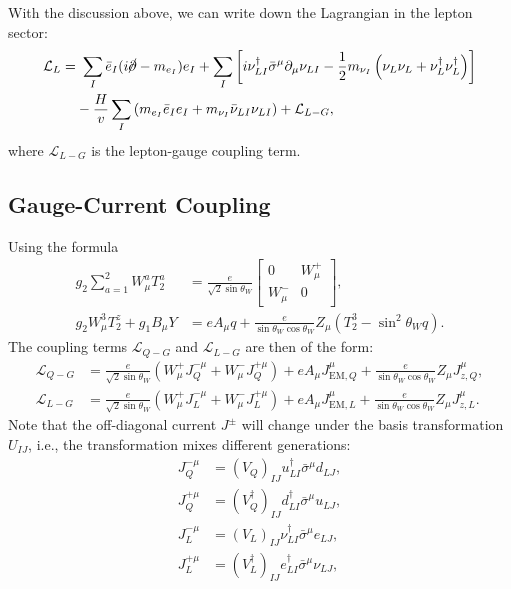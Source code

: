 With the discussion above, we can write down the Lagrangian in the lepton sector:
\begin{equation}
\begin{aligned}
	\mathcal L_L =&\ \sum_I \bar e_I (i\cancel\partial-m_{e_I})e_I + \sum_I \left[i\nu_{LI}^\dagger \bar\sigma^\mu \partial_\mu \nu_{LI} - \frac{1}{2}m_{\nu_I} \left(\nu_L \nu_L + \nu_L^\dagger \nu_L^\dagger\right)\right] \\
	& -\frac{H}{v} \sum_I \left(m_{e_I} \bar e_I e_I + m_{\nu_I}\bar\nu_{LI}\nu_{LI}\right)+ \mathcal L_{L-G},
\end{aligned}
\end{equation}
where $\mathcal L_{L-G}$ is the lepton-gauge coupling term.



\subsection{Gauge-Current Coupling}
Using the formula
\begin{equation}
\begin{aligned}
	g_2 \sum_{a=1}^2 W^a_\mu T^a_2 &= \frac{e}{\sqrt{2}\sin{\theta_W}}\begin{bmatrix}
		0 & W_\mu^+ \\ W_\mu^- & 0
	\end{bmatrix}, \\
	g_2 W_\mu^3 T^z_2 + g_1 B_\mu Y
	&= e A_\mu q + \frac{e}{\sin{\theta_W}\cos{\theta_W}} Z_\mu \left(T_2^3 - \sin^2{\theta_W} q\right).
\end{aligned}
\end{equation}
The coupling terms $\mathcal L_{Q-G}$ and $\mathcal L_{L-G}$ are then of the form:
\begin{equation}
\begin{aligned}
	\mathcal L_{Q-G} &= \frac{e}{\sqrt{2}\sin{\theta_W}} \left(W^{+}_\mu J_Q^{-\mu} + W^{-}_\mu J_Q^{+\mu} \right) + e A_\mu J^{\mu}_{\mathrm{EM},Q} + \frac{e}{\sin{\theta_W}\cos{\theta_W}} Z_\mu J^\mu_{z,Q}, \\
	\mathcal L_{L-G} &= \frac{e}{\sqrt{2}\sin{\theta_W}}\left(W^{+}_\mu J_L^{-\mu} + W^{-}_\mu J_L^{+\mu} \right) + e A_\mu J^{\mu}_{\mathrm{EM},L} + \frac{e}{\sin{\theta_W}\cos{\theta_W}} Z_\mu J^\mu_{z,L}.
\end{aligned}
\end{equation}
Note that the off-diagonal current $J^\pm$ will change under the basis transformation $U_{IJ}$, i.e., the transformation mixes different generations:
\begin{equation}
\begin{aligned}
	J^{-\mu}_Q &= (V_Q)_{IJ} u_{LI}^\dagger \bar\sigma^\mu d_{LJ}, \\
	J^{+\mu}_Q &= (V^\dagger_Q)_{IJ} d_{LI}^\dagger \bar\sigma^\mu u_{LJ}, \\
	J^{-\mu}_L &= (V_L)_{IJ} \nu_{LI}^\dagger \bar\sigma^\mu e_{LJ}, \\
	J^{+\mu}_L &= (V^\dagger_L)_{IJ} e_{LI}^\dagger \bar\sigma^\mu \nu_{LJ},
\end{aligned}
\end{equation}
